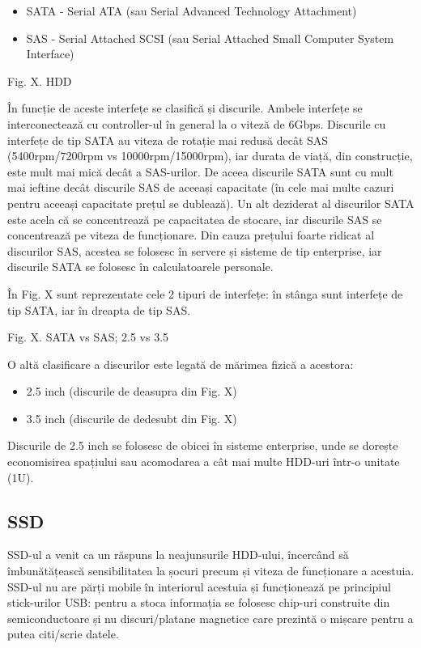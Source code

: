 \begin{itemize}
	\item SATA - Serial ATA (sau Serial Advanced Technology Attachment)
	\item SAS - Serial Attached SCSI (sau Serial Attached Small Computer
		System Interface)
\end{itemize}

Fig. X. HDD

În funcție de aceste interfețe se clasifică și discurile. Ambele interfețe se
interconectează cu controller-ul în general la o viteză de 6Gbps. Discurile cu
interfețe de tip SATA au viteza de rotație mai redusă decât SAS (5400rpm/7200rpm
vs 10000rpm/15000rpm), iar durata de viață, din construcție, este mult mai mică
decât a SAS-urilor. De aceea discurile SATA sunt cu mult mai ieftine decât
discurile SAS de aceeași capacitate (în cele mai multe cazuri pentru aceeași
capacitate prețul se dublează). Un alt deziderat al discurilor SATA este acela
că se concentrează pe capacitatea de stocare, iar discurile SAS se concentrează
pe viteza de funcționare. Din cauza prețului foarte ridicat al discurilor SAS,
acestea se folosesc în servere și sisteme de tip enterprise, iar discurile SATA
se folosesc în calculatoarele personale.

În Fig. X sunt reprezentate cele 2 tipuri de interfețe: în stânga sunt interfețe
de tip SATA, iar în dreapta de tip SAS.

Fig. X. SATA vs SAS; 2.5 vs 3.5

O altă clasificare a discurilor este legată de mărimea fizică a acestora:

\begin{itemize}
	\item 2.5 inch (discurile de deasupra din Fig. X)
	\item 3.5 inch (discurile de dedesubt din Fig. X)
\end{itemize}


Discurile de 2.5 inch se folosesc de obicei în sisteme enterprise, unde se
dorește economisirea spațiului sau acomodarea a cât mai multe HDD-uri într-o
unitate (1U).

\subsection{SSD}
\label{sec:storage-tipuri-ssd}

SSD-ul a venit ca un răspuns la neajunsurile HDD-ului, încercând să
îmbunătățească sensibilitatea la șocuri precum și viteza de funcționare a
acestuia. SSD-ul nu are părți mobile în interiorul acestuia și funcționează pe
principiul stick-urilor USB: pentru a stoca informația se folosesc chip-uri
construite din semiconductoare și nu discuri/platane magnetice care prezintă o
mișcare pentru a putea citi/scrie datele.

